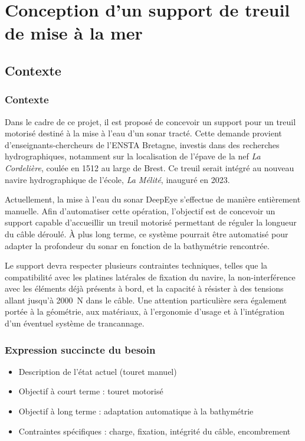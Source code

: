 \documentclass[12pt,a4paper]{report}
\begin{document}

\chapter{Conception d'un support de treuil de mise à la mer}

\section{Contexte}
\subsection{Contexte}
Dans le cadre de ce projet, il est proposé de concevoir un support pour un treuil motorisé destiné à la mise à l’eau d’un sonar tracté. Cette demande provient d’enseignants-chercheurs de l’ENSTA Bretagne, investis dans des recherches hydrographiques, notamment sur la localisation de l’épave de la nef \textit{La Cordelière}, coulée en 1512 au large de Brest. Ce treuil serait intégré au nouveau navire hydrographique de l’école, \textit{La Mélité}, inauguré en 2023.

Actuellement, la mise à l’eau du sonar DeepEye s’effectue de manière entièrement manuelle. Afin d’automatiser cette opération, l’objectif est de concevoir un support capable d’accueillir un treuil motorisé permettant de réguler la longueur du câble déroulé. À plus long terme, ce système pourrait être automatisé pour adapter la profondeur du sonar en fonction de la bathymétrie rencontrée.

Le support devra respecter plusieurs contraintes techniques, telles que la compatibilité avec les platines latérales de fixation du navire, la non-interférence avec les éléments déjà présents à bord, et la capacité à résister à des tensions allant jusqu’à 2000~N dans le câble. Une attention particulière sera également portée à la géométrie, aux matériaux, à l’ergonomie d’usage et à l’intégration d’un éventuel système de trancannage.
\subsection{Expression succincte du besoin}
\begin{itemize}
  \item Description de l’état actuel (touret manuel)
  \item Objectif à court terme : touret motorisé
  \item Objectif à long terme : adaptation automatique à la bathymétrie
  \item Contraintes spécifiques : charge, fixation, intégrité du câble, encombrement
\end{itemize}
\end{document}
